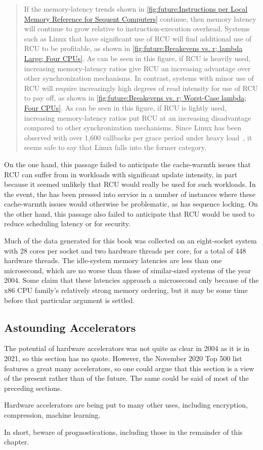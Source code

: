 \begin{quote}
	If the memory-latency trends shown in
	\cref{fig:future:Instructions per Local Memory Reference for Sequent Computers}
	continue, then memory latency will continue to grow relative
	to instruction-execution overhead.
	Systems such as Linux that have significant use of RCU will find
	additional use of RCU to be profitable, as shown in
	\cref{fig:future:Breakevens vs. r; lambda Large; Four CPUs}.
	As can be seen in this figure, if RCU is heavily used, increasing
	memory-latency ratios give RCU an increasing advantage over other
	synchronization mechanisms.
	In contrast, systems with minor
	use of RCU will require increasingly high degrees of read intensity
	for use of RCU to pay off, as shown in
	\cref{fig:future:Breakevens vs. r; Worst-Case lambda; Four CPUs}.
	As can be seen in this figure, if RCU is lightly used,
	increasing memory-latency ratios
	put RCU at an increasing disadvantage compared to other synchronization
	mechanisms.
	Since Linux has been observed with over 1,600 callbacks per grace
	period under heavy load~\cite{Sarma04c},
	it seems safe to say that Linux falls into the former category.
\end{quote}

On the one hand, this passage failed to anticipate the cache-warmth
issues that RCU can suffer from in workloads with significant update
intensity, in part because it seemed unlikely that RCU would really
be used for such workloads.
In the event, the  has been pressed into
service in a number of instances where these cache-warmth issues would
otherwise be problematic, as has sequence locking.
On the other hand, this passage also failed to anticipate that
RCU would be used to reduce scheduling latency or for security.

Much of the data generated for this book was collected on an eight-socket
system with 28 cores per socket and two hardware threads per core, for
a total of 448 hardware threads.
The idle-system memory latencies are less than one microsecond, which
are no worse than those of similar-sized systems of the year 2004.
Some claim that these latencies approach a microsecond only because of
the x86 CPU family's relatively strong memory ordering, but it may be
some time before that particular argument is settled.

\subsection{Astounding Accelerators}
\label{sec:future:Astounding Accelerators}

The potential of hardware accelerators was not quite as clear in 2004
as it is in 2021, so this section has no quote.
However, the November 2020 Top 500 list~\cite{Top500} features a great
many accelerators, so one could argue that this section is a view of
the present rather than of the future.
The same could be said of most of the preceding sections.

Hardware accelerators are being put to many other uses, including
encryption, compression, machine learning.

In short, beware of prognostications, including those in the remainder
of this chapter.

